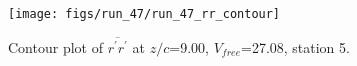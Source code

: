 \begin{figure}[H]
\centering
\texttt{[image: figs/run\_47/run\_47\_rr\_contour]}
\caption{Contour plot of $\overline{r^\prime r^\prime}$ at $z/c$=9.00, $V_{free}$=27.08, station 5.}
\label{fig:run_47_rr_contour}
\end{figure}



